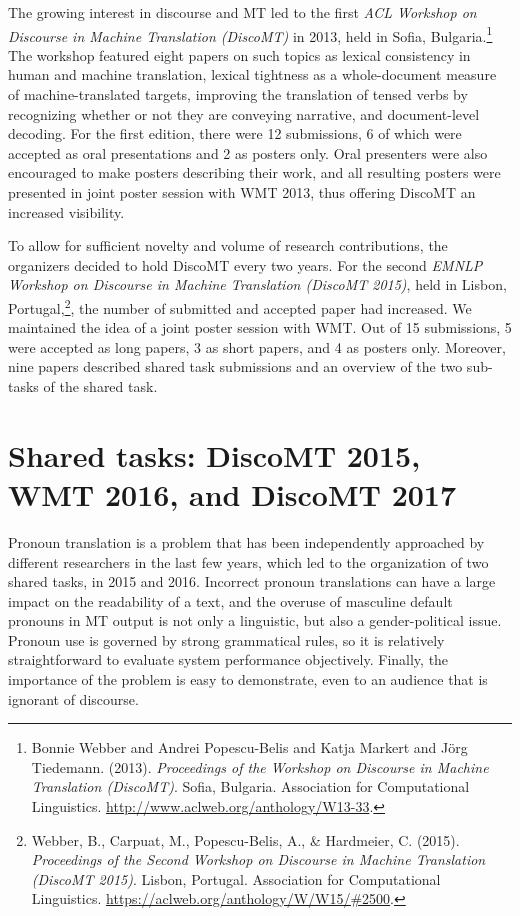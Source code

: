 \documentclass[11pt]{article}
\begin{document}
The growing interest in discourse and MT led to the first
\textit{ACL Workshop on Discourse in Machine Translation (DiscoMT)} in 2013,
held in Sofia, Bulgaria.\footnote{Bonnie Webber  and  Andrei Popescu-Belis  and  Katja Markert  and  J\"{o}rg Tiedemann. (2013). \textit{Proceedings of the Workshop on Discourse in Machine Translation (DiscoMT)}. Sofia, Bulgaria. Association for Computational Linguistics. \url{http://www.aclweb.org/anthology/W13-33}.}
The workshop
featured eight papers on such topics as lexical consistency in human and
machine translation, lexical tightness as a whole-document
measure of machine-translated targets, improving
the translation of tensed verbs by recognizing whether or not they are
conveying narrative, and document-level decoding.  For the first edition,
there were 12 submissions, 6 of which were accepted as oral presentations and
2 as posters only.  Oral presenters were also encouraged to make posters
describing their work, and all resulting posters were presented in joint
poster session with WMT 2013, thus offering DiscoMT an increased visibility.

To allow for sufficient novelty and volume of research contributions, the
organizers decided to hold DiscoMT every two years.  For the second
\textit{EMNLP Workshop on Discourse in Machine Translation (DiscoMT 2015)},
held in Lisbon, Portugal,\footnote{Webber, B., Carpuat, M., Popescu-Belis, A., \& Hardmeier, C. (2015). \textit{Proceedings of the Second Workshop on Discourse in Machine Translation (DiscoMT 2015)}. Lisbon, Portugal. Association for Computational Linguistics.  \url{https://aclweb.org/anthology/W/W15/\#2500}.}, the number of submitted and accepted paper had increased.  We maintained the idea of a joint poster session with WMT.  Out of 15 submissions,
5 were accepted as long papers, 3 as short papers, and 4 as posters only.  Moreover, nine papers described shared task submissions and an overview of the two sub-tasks of the shared task.

\section{Shared tasks: DiscoMT 2015, WMT 2016, and DiscoMT 2017}

Pronoun translation is a problem that has been independently approached
by different researchers in the last few years, which led to the organization of two shared tasks, in 2015 and 2016.
Incorrect pronoun translations can have a large impact on the readability
of a text, and the overuse of masculine default pronouns in MT output is not
only a linguistic, but also a gender-political issue.
Pronoun use is governed by strong grammatical rules, so it is relatively
straightforward to evaluate system performance objectively. Finally, the
importance of the problem is easy to demonstrate, even to an audience that is
ignorant of discourse.
\end{document}

